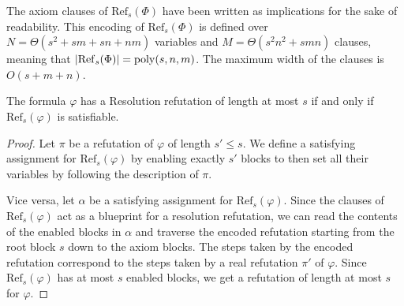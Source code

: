 \noindent
The axiom clauses of $\mathrm{Ref}_s(\Phi)$ have been written as implications for the sake of readability. This encoding of $\mathrm{Ref}_s(\Phi)$ is defined over $N = \Theta(s^2 + sm + sn + nm)$ variables and $M = \Theta(s^2n^2 + smn)$ clauses, meaning that $\left|\mathrm{Ref}_s(\Phi)\right| = \mathrm{poly}(s,n,m)$. The maximum width of the clauses is $O(s+m+n)$.

\begin{proposition}
    The formula $\varphi$ has a Resolution refutation of length at most $s$ if and only if $\mathrm{Ref}_s(\varphi)$ is satisfiable.
\end{proposition}

\begin{proof}
    Let $\pi$ be a refutation of $\varphi$ of length $s' \leq s$. We define a satisfying assignment for $\mathrm{Ref}_s(\varphi)$ by enabling exactly $s'$ blocks to then set all their variables by following the description of $\pi$.

    Vice versa, let $\alpha$ be a satisfying assignment for $\mathrm{Ref}_s(\varphi)$. Since the clauses of $\mathrm{Ref}_s(\varphi)$ act as a blueprint for a resolution refutation, we can read the contents of the enabled blocks in $\alpha$ and traverse the encoded refutation starting from the root block $s$ down to the axiom blocks. The steps taken by the encoded refutation correspond to the steps taken by a real refutation $\pi'$ of $\varphi$. Since $\mathrm{Ref}_s(\varphi)$ has at most $s$ enabled blocks, we get a refutation of length at most $s$ for $\varphi$.  
\end{proof}


